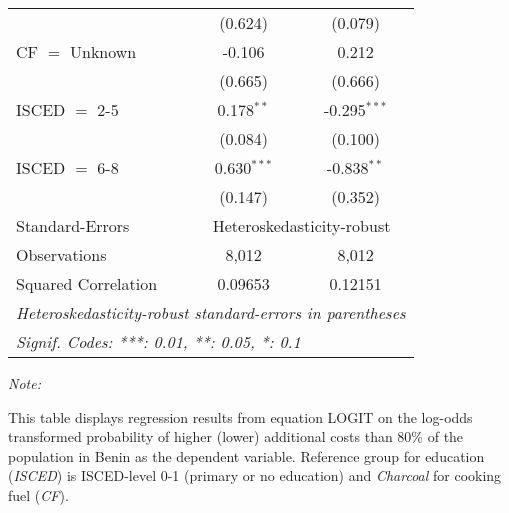 \begin{table}[htbp!]
\begin{adjustbox}{width = 1\textwidth, max height = 0.95\textheight, center}
\begin{threeparttable}[b]
\begin{tabular}{lcc}
                                 & (0.624)       & (0.079)\\   
            CF $=$ Unknown       & -0.106        & 0.212\\   
                                 & (0.665)       & (0.666)\\   
            ISCED $=$ 2-5        & 0.178$^{**}$  & -0.295$^{***}$\\   
                                 & (0.084)       & (0.100)\\   
            ISCED $=$ 6-8        & 0.630$^{***}$ & -0.838$^{**}$\\   
                                 & (0.147)       & (0.352)\\   
            \midrule 
            Standard-Errors & \multicolumn{2}{c}{Heteroskedasticity-robust} \\ 
            Observations         & 8,012         & 8,012\\  
            Squared Correlation  & 0.09653       & 0.12151\\  
            \midrule \midrule
            \multicolumn{3}{l}{\emph{Heteroskedasticity-robust standard-errors in parentheses}}\\
            \multicolumn{3}{l}{\emph{Signif. Codes: ***: 0.01, **: 0.05, *: 0.1}}\\
         \end{tabular}
         
         \begin{tablenotes}\item \medskip \textit{Note:}
            \item This table displays regression results from equation LOGIT on the log-odds transformed probability of higher (lower) additional costs than 80\% of the population in Benin as the dependent variable. Reference group for education (\textit{ISCED}) is ISCED-level 0-1 (primary or no education) and \textit{Charcoal} for cooking fuel (\textit{CF}).
         \end{tablenotes}
      \end{threeparttable}
   \end{adjustbox}
\end{table}


